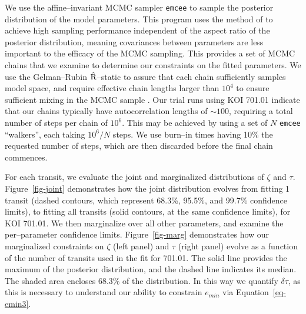 We use the affine--invariant MCMC sampler {\tt emcee}
\citep{2013PASP..125..306F} to sample the posterior distribution of
the model parameters.  This program uses the method of
\cite{Goodman-Weare} to achieve high sampling performance independent
of the aspect ratio of the posterior distribution, meaning covariances
between parameters are less important to the efficacy of the MCMC
sampling.  This provides a set of MCMC chains that we examine to
determine our constraints on the fitted parameters.  We use the
Gelman--Rubin $\hat{\rm R}$--static \citep{Gelman92} to assure that
each chain sufficiently samples model space, and require effective
chain lengths larger than $10^4$ to ensure sufficient mixing in the
MCMC sample \cite[e.g.][]{2004PhRvD..69j3501T}.  Our trial runs using
KOI 701.01 indicate that our chains typically have autocorrelation
lengths of $\sim 100$, requiring a total number of steps per chain of
$10^6$.  This may be achieved by using a set of $N$ {\tt emcee}
``walkers'', each taking $10^6/N$ steps.  We use burn--in times having
10\% the requested number of steps, which are then discarded before
the final chain commences.

For each transit, we evaluate the joint and marginalized distributions
of $\zeta$ and $\tau$.  Figure~\ref{fig-joint} demonstrates how the
joint distribution evolves from fitting 1 transit (dashed contours,
which represent 68.3\%, 95.5\%, and 99.7\% confidence limits), to
fitting all transits (solid contours, at the same confidence limits),
for KOI 701.01.  We then marginalize over all other parameters, and
examine the per--parameter confidence limits.  Figure~\ref{fig-marg}
demonstrates how our marginalized constraints on $\zeta$ (left panel)
and $\tau$ (right panel) evolve as a function of the number of
transits used in the fit for 701.01.  The solid line provides the
maximum of the posterior distribution, and the dashed line indicates
its median.  The shaded area encloses 68.3\% of the distribution.  In
this way we quantify $\delta \tau$, as this is necessary to understand
our ability to constrain $e_{min}$ via Equation~\ref{eq-emin3}.

